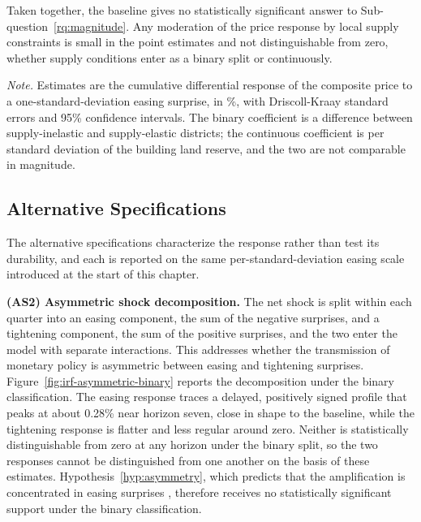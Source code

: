 \documentclass[a4paper,12pt, headsepline]{scrartcl}
\newcommand{\figcap}[2]{\caption[#1]{\textbf{#1}\newline #2}}
\numberwithin{equation}{section}
\begin{document}
Taken together, the baseline gives no statistically significant answer to Sub-question~\ref{rq:magnitude}. Any moderation of the price response by local supply constraints is small in the point estimates and not distinguishable from zero, whether supply conditions enter as a binary split or continuously.

\begin{table}[H]
	\centering
	\figcap{Baseline differential response, binary and continuous supply measures}{Response to a one-standard-deviation easing surprise, in \%, at selected horizons.}\label{tab:irf-baseline}
	

	\vspace{0.2cm}
	\begin{minipage}{0.9\textwidth}
		\footnotesize
		\textit{Note.} Estimates are the cumulative differential response of the composite price to a one-standard-deviation easing surprise, in \%, with Driscoll-Kraay standard errors and 95\% confidence intervals. The binary coefficient is a difference between supply-inelastic and supply-elastic districts; the continuous coefficient is per standard deviation of the building land reserve, and the two are not comparable in magnitude.
	\end{minipage}
\end{table}

\subsection{Alternative Specifications}\label{subsec:alt-responses}
The alternative specifications characterize the response rather than test its durability, and each is reported on the same per-standard-deviation easing scale introduced at the start of this chapter.

\textbf{(AS2) Asymmetric shock decomposition.} The net shock is split within each quarter into an easing component, the sum of the negative surprises, and a tightening component, the sum of the positive surprises, and the two enter the model with separate interactions. This addresses whether the transmission of monetary policy is asymmetric between easing and tightening surprises. Figure~\ref{fig:irf-asymmetric-binary} reports the decomposition under the binary classification. The easing response traces a delayed, positively signed profile that peaks at about 0.28\% near horizon seven, close in shape to the baseline, while the tightening response is flatter and less regular around zero. Neither is statistically distinguishable from zero at any horizon under the binary split, so the two responses cannot be distinguished from one another on the basis of these estimates. Hypothesis~\ref{hyp:asymmetry}, which predicts that the amplification is concentrated in easing surprises \citep{glaeser2005, aastveit2022}, therefore receives no statistically significant support under the binary classification.
\end{document}
